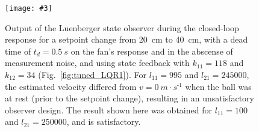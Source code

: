\documentclass[10pt,twoside,openright]{article}
\newcommand{\mijnfiguur}[5][ht]{            %
    \begin{figure}[#1]                      %
        \begin{center}                      %
            \texttt{[image: \#3]}        %
        \end{center}
        \caption{#4\label{#5}}          %
    \end{figure}
    }
\begin{document}
\mijnfiguur[h!]{width=\linewidth}{tuned_LQR2.pdf}{Output of the Luenberger state observer during the closed-loop response for a setpoint change from 20~cm to 40~cm, with a dead time of $t_d=0.5~s$ on the fan's response and in the abscense of measurement noise, and using state feedback with $k_{11} =118$ and $k_{12} =34$ (Fig.~\ref{fig:tuned_LQR1}). For $l_{11} = 995$ and $l_{21}= 245000$, the estimated velocity differed from $v=0~m\cdot s^{\text{-}1}$ when the ball was at rest (prior to the setpoint change), resulting in an unsatisfactory observer design. The result shown here was obtained for $l_{11} = 100$ and $l_{21} = 250000$, and is satisfactory.}{fig:tuned_LQR2}
\end{document}
